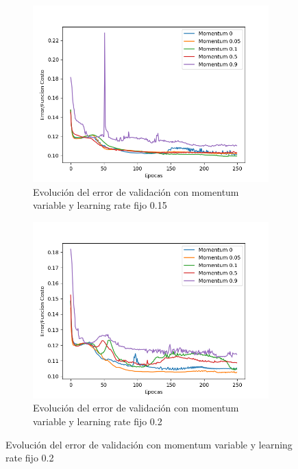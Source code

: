 \begin{figure}[!htbp]
\centering
\begin{subfigure}{.5\textwidth}
  \centering
  \includegraphics[width=1\linewidth]{graficos/ej2/eta_x_momentum_promedios_validacion_0_15.png}
  \caption{Evolución del error de validación con momentum variable y learning rate fijo 0.15}
  \label{fig:sub1}
\end{subfigure}%
\begin{subfigure}{.5\textwidth}
  \centering
  \includegraphics[width=1\linewidth]{graficos/ej2/eta_x_momentum_promedios_validacion_0_2.png}
  \caption{Evolución del error de validación con momentum variable y learning rate fijo 0.2}
  \label{fig:sub2}
\end{subfigure}
\end{figure}

